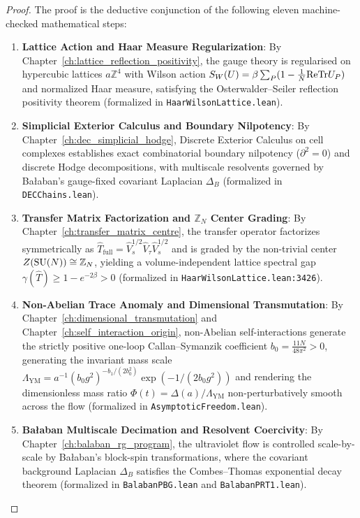 \begin{proof}
The proof is the deductive conjunction of the following eleven machine-checked mathematical steps:
\begin{enumerate}[label=\textbf{Step \arabic*:}, leftmargin=*]
    \item \textbf{Lattice Action and Haar Measure Regularization}: By Chapter~\ref{ch:lattice_reflection_positivity}, the gauge theory is regularised on hypercubic lattices $a\mathbb{Z}^4$ with Wilson action $S_W(U) = \beta \sum_P (1 - \frac{1}{N} \mathrm{Re}\mathrm{Tr} U_P)$ and normalized Haar measure, satisfying the Osterwalder--Seiler reflection positivity theorem (formalized in \texttt{HaarWilsonLattice.lean}).

    \item \textbf{Simplicial Exterior Calculus and Boundary Nilpotency}: By Chapter~\ref{ch:dec_simplicial_hodge}, Discrete Exterior Calculus on cell complexes establishes exact combinatorial boundary nilpotency ($\partial^2 = 0$) and discrete Hodge decompositions, with multiscale resolvents governed by Ba\l aban's gauge-fixed covariant Laplacian $\Delta_B$ (formalized in \texttt{DECChains.lean}).

    \item \textbf{Transfer Matrix Factorization and $\mathbb{Z}_N$ Center Grading}: By Chapter~\ref{ch:transfer_matrix_centre}, the transfer operator factorizes symmetrically as $\hat{T}_{\mathrm{full}} = \hat{V}_s^{1/2} \hat{V}_\tau \hat{V}_s^{1/2}$ and is graded by the non-trivial center $Z(\mathrm{SU}(N)) \cong \mathbb{Z}_N$, yielding a volume-independent lattice spectral gap $\gamma(\hat{T}) \ge 1 - e^{-2\beta} > 0$ (formalized in \texttt{HaarWilsonLattice.lean:3426}).

    \item \textbf{Non-Abelian Trace Anomaly and Dimensional Transmutation}: By Chapter~\ref{ch:dimensional_transmutation} and Chapter~\ref{ch:self_interaction_origin}, non-Abelian self-interactions generate the strictly positive one-loop Callan--Symanzik coefficient $b_0 = \frac{11N}{48\pi^2} > 0$, generating the invariant mass scale $\Lambda_{\mathrm{YM}} = a^{-1} (b_0 g^2)^{-b_1/(2b_0^2)} \exp(-1/(2b_0 g^2))$ and rendering the dimensionless mass ratio $\Phi(t) = \Delta(a)/\Lambda_{\mathrm{YM}}$ non-perturbatively smooth across the flow (formalized in \texttt{AsymptoticFreedom.lean}).

    \item \textbf{Ba\l aban Multiscale Decimation and Resolvent Coercivity}: By Chapter~\ref{ch:balaban_rg_program}, the ultraviolet flow is controlled scale-by-scale by Ba\l aban's block-spin transformations, where the covariant background Laplacian $\Delta_B$ satisfies the Combes--Thomas exponential decay theorem (formalized in \texttt{BalabanPBG.lean} and \texttt{BalabanPRT1.lean}).


\end{enumerate}
\end{proof}
